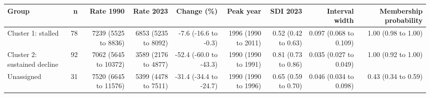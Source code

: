 \begin{tabular}{lrrrrrrrr}
\toprule
Group & n & Rate 1990 & Rate 2023 & Change (\%) & Peak year & SDI 2023 & Interval width & Membership probability \\
\midrule
Cluster 1: stalled & 78 & 7239 (5525 to 8836) & 6853 (5235 to 8092) & -7.6 (-16.6 to -0.3) & 1996 (1990 to 2011) & 0.52 (0.42 to 0.63) & 0.097 (0.068 to 0.109) & 1.00 (0.98 to 1.00) \\
Cluster 2: sustained decline & 92 & 7062 (5645 to 10372) & 3589 (2176 to 4877) & -52.4 (-60.0 to -43.3) & 1990 (1990 to 1991) & 0.81 (0.73 to 0.86) & 0.035 (0.027 to 0.049) & 1.00 (0.92 to 1.00) \\
Unassigned & 31 & 7520 (6645 to 11576) & 5399 (4478 to 7511) & -31.4 (-34.4 to -24.7) & 1990 (1990 to 1996) & 0.65 (0.59 to 0.70) & 0.046 (0.034 to 0.098) & 0.43 (0.34 to 0.59) \\
\bottomrule
\end{tabular}
